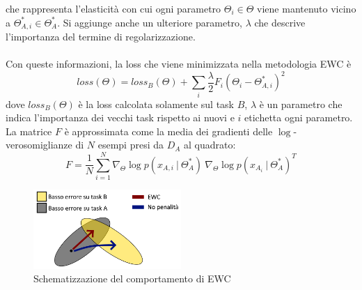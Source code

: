 che rappresenta l'elasticità con cui ogni parametro $\Theta_i \in \Theta$ viene mantenuto vicino a $\Theta_{A,i}^*\in\Theta_A^*$. Si aggiunge anche un ulteriore parametro, $\lambda$ che descrive l'importanza del termine di regolarizzazione.\\\\
Con queste informazioni, la loss che viene minimizzata nella metodologia EWC è
\begin{equation}\label{eq:ewc_loss}
    loss(\Theta) = loss_B(\Theta) + \sum_i \frac{\lambda}{2} F_i\left(\Theta_i - \Theta_{A,i}^*\right)^2
\end{equation}
dove $loss_B(\Theta)$ è la loss calcolata solamente sul task $B$, $\lambda$ è un parametro che indica l'importanza dei vecchi task rispetto ai nuovi e $i$ etichetta ogni parametro. La matrice $F$ è approssimata come la media dei gradienti delle $\log$-verosomiglianze di $N$ esempi presi da $D_A$ al quadrato:
\begin{equation}\label{eq:ewc_F}
    F = \frac{1}{N}\sum_{i=1}^N \nabla_\Theta \log p(x_{A,i}\:|\:\Theta_A^*)\:\nabla_\Theta \log p(x_{A_i}\:|\:\Theta_A^*)^T
\end{equation}
\begin{figure}[h]
	\begin{center}
		\includegraphics[width=0.5\textwidth]{img/ewc.png}
		\caption{Schematizzazione del comportamento di EWC}
		\label{fig:ewc}
	\end{center}
\end{figure}
